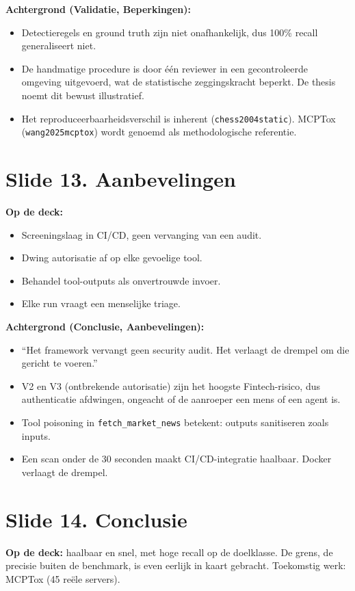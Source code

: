 \documentclass[11pt,a4paper]{article}
\newcommand{\code}[1]{\texttt{\small #1}}
\begin{document}
\textbf{Achtergrond (Validatie, Beperkingen):}
\begin{itemize}
  \item Detectieregels en ground truth zijn niet onafhankelijk, dus 100\% recall generaliseert niet.
  \item De handmatige procedure is door \'e\'en reviewer in een gecontroleerde omgeving uitgevoerd, wat de statistische zeggingskracht beperkt. De thesis noemt dit bewust illustratief.
  \item Het reproduceerbaarheidsverschil is inherent (\code{chess2004static}). MCPTox (\code{wang2025mcptox}) wordt genoemd als methodologische referentie.
\end{itemize}

\section{Slide 13. Aanbevelingen}
\textbf{Op de deck:}
\begin{itemize}
  \item Screeningslaag in CI/CD, geen vervanging van een audit.
  \item Dwing autorisatie af op elke gevoelige tool.
  \item Behandel tool-outputs als onvertrouwde invoer.
  \item Elke run vraagt een menselijke triage.
\end{itemize}

\textbf{Achtergrond (Conclusie, Aanbevelingen):}
\begin{itemize}
  \item ``Het framework vervangt geen security audit. Het verlaagt de drempel om die gericht te voeren.''
  \item V2 en V3 (ontbrekende autorisatie) zijn het hoogste Fintech-risico, dus authenticatie afdwingen, ongeacht of de aanroeper een mens of een agent is.
  \item Tool poisoning in \code{fetch\_market\_news} betekent: outputs sanitiseren zoals inputs.
  \item Een scan onder de 30 seconden maakt CI/CD-integratie haalbaar. Docker verlaagt de drempel.
\end{itemize}

\section{Slide 14. Conclusie}
\textbf{Op de deck:} haalbaar en snel, met hoge recall op de doelklasse. De grens, de precisie buiten de benchmark, is even eerlijk in kaart gebracht. Toekomstig werk: MCPTox (45 re\"ele servers).
\end{document}
